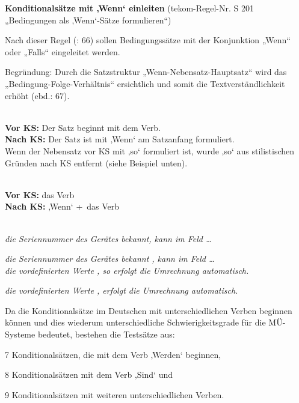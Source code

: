 \begin{description}[font=\normalfont\bfseries]
\item [Beschreibung der KS-Regel:] \textbf{Konditionalsätze mit ‚Wenn‘ einleiten} (tekom-Regel-Nr. S 201 „Bedingungen als ‚Wenn‘-Sätze formulieren“)

Nach dieser Regel (\citealt{tekom2013}: 66) sollen Bedingungssätze mit der Konjunktion „Wenn“ oder „Falls“ eingeleitet werden.

Begründung: Durch die Satzstruktur „Wenn-Nebensatz-Hauptsatz“ wird das „Bedingung-Folge-Verhältnis“ ersichtlich und somit die Textverständlichkeit erhöht (ebd.: 67).

\item[Umsetzungsmuster:]
~\\
\textbf{Vor KS:} Der Satz beginnt mit dem Verb.\\
\textbf{Nach KS:} Der Satz ist mit ‚Wenn‘ am Satzanfang formuliert.\\
Wenn der Nebensatz vor KS mit ‚so‘ formuliert ist, wurde ‚so‘ aus stilistischen Gründen nach KS entfernt (siehe Beispiel unten).

\item[KS-Stelle]
~\\
\textbf{Vor KS:} das Verb\\
\textbf{Nach KS:} ‚Wenn‘ +~das Verb

\item[Beispiele]
~\\
\textit{ die Seriennummer des Gerätes bekannt, kann im Feld \ldots}

\textit{ die Seriennummer des Gerätes bekannt , kann im Feld \ldots}
~\\
\textit{ die vordefinierten Werte , so erfolgt die Umrechnung automatisch.}

\textit{ die vordefinierten Werte , erfolgt die Umrechnung automatisch.}

\item[Aufteilung der Testsätze:]
Da die Konditionalsätze im Deutschen mit unterschiedlichen Verben beginnen können und dies wiederum unterschiedliche Schwierigkeitsgrade für die MÜ-Systeme bedeutet, bestehen die Testsätze aus:

7 Konditionalsätzen, die mit dem Verb ‚Werden‘ beginnen,

8 Konditionalsätzen mit dem Verb ‚Sind‘ und

9 Konditionalsätzen mit weiteren unterschiedlichen Verben.

\end{description}



